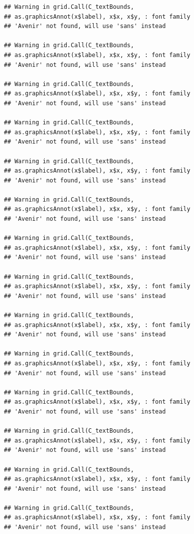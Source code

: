 \documentclass[]{krantz}
\begin{document}
\begin{verbatim}
## Warning in grid.Call(C_textBounds,
## as.graphicsAnnot(x$label), x$x, x$y, : font family
## 'Avenir' not found, will use 'sans' instead

## Warning in grid.Call(C_textBounds,
## as.graphicsAnnot(x$label), x$x, x$y, : font family
## 'Avenir' not found, will use 'sans' instead

## Warning in grid.Call(C_textBounds,
## as.graphicsAnnot(x$label), x$x, x$y, : font family
## 'Avenir' not found, will use 'sans' instead

## Warning in grid.Call(C_textBounds,
## as.graphicsAnnot(x$label), x$x, x$y, : font family
## 'Avenir' not found, will use 'sans' instead

## Warning in grid.Call(C_textBounds,
## as.graphicsAnnot(x$label), x$x, x$y, : font family
## 'Avenir' not found, will use 'sans' instead

## Warning in grid.Call(C_textBounds,
## as.graphicsAnnot(x$label), x$x, x$y, : font family
## 'Avenir' not found, will use 'sans' instead

## Warning in grid.Call(C_textBounds,
## as.graphicsAnnot(x$label), x$x, x$y, : font family
## 'Avenir' not found, will use 'sans' instead

## Warning in grid.Call(C_textBounds,
## as.graphicsAnnot(x$label), x$x, x$y, : font family
## 'Avenir' not found, will use 'sans' instead

## Warning in grid.Call(C_textBounds,
## as.graphicsAnnot(x$label), x$x, x$y, : font family
## 'Avenir' not found, will use 'sans' instead

## Warning in grid.Call(C_textBounds,
## as.graphicsAnnot(x$label), x$x, x$y, : font family
## 'Avenir' not found, will use 'sans' instead

## Warning in grid.Call(C_textBounds,
## as.graphicsAnnot(x$label), x$x, x$y, : font family
## 'Avenir' not found, will use 'sans' instead

## Warning in grid.Call(C_textBounds,
## as.graphicsAnnot(x$label), x$x, x$y, : font family
## 'Avenir' not found, will use 'sans' instead

## Warning in grid.Call(C_textBounds,
## as.graphicsAnnot(x$label), x$x, x$y, : font family
## 'Avenir' not found, will use 'sans' instead

## Warning in grid.Call(C_textBounds,
## as.graphicsAnnot(x$label), x$x, x$y, : font family
## 'Avenir' not found, will use 'sans' instead
\end{verbatim}
\end{document}
